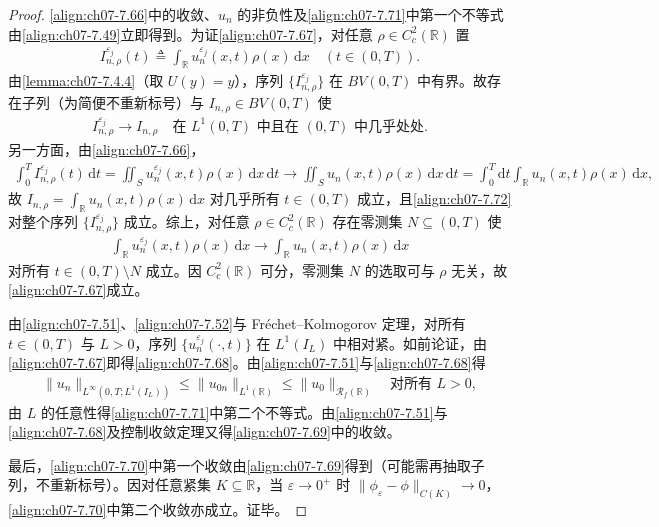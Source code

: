 ﻿\documentclass[../../main.tex]{subfiles}%
\begin{document}
\begin{proof}
\eqref{align:ch07-7.66}中的收敛、$u_n$ 的非负性及\eqref{align:ch07-7.71}中第一个不等式由\eqref{align:ch07-7.49}立即得到。为证\eqref{align:ch07-7.67}，对任意 $\rho\in C^2_c(\mathbb{R})$ 置
\begin{align*}
I_{n,\rho}^{\varepsilon_j}(t)\triangleq\int_{\mathbb{R}}u_n^{\varepsilon_j}(x,t)\rho(x)\,\mathrm{d}x\quad(t\in(0,T)).
\end{align*}
由\cref{lemma:ch07-7.4.4}（取 $U(y)=y$），序列 $\{I_{n,\rho}^{\varepsilon_j}\}$ 在 $BV(0,T)$ 中有界。故存在子列（为简便不重新标号）与 $I_{n,\rho}\in BV(0,T)$ 使
\begin{align}
I_{n,\rho}^{\varepsilon_j}\to I_{n,\rho}\quad\text{在 }L^1(0,T)\text{ 中且在 }(0,T)\text{ 中几乎处处}. \label{align:ch07-7.72}
\end{align}
另一方面，由\eqref{align:ch07-7.66}，
\begin{align*}
\int_0^TI_{n,\rho}^{\varepsilon_j}(t)\,\mathrm{d}t=\iint_Su_n^{\varepsilon_j}(x,t)\rho(x)\,\mathrm{d}x\,\mathrm{d}t
\to\iint_Su_n(x,t)\rho(x)\,\mathrm{d}x\,\mathrm{d}t=\int_0^T\mathrm{d}t\int_{\mathbb{R}}u_n(x,t)\rho(x)\,\mathrm{d}x,
\end{align*}
故 $I_{n,\rho}=\int_{\mathbb{R}}u_n(x,t)\rho(x)\,\mathrm{d}x$ 对几乎所有 $t\in(0,T)$ 成立，且\eqref{align:ch07-7.72}对整个序列 $\{I_{n,\rho}^{\varepsilon_j}\}$ 成立。综上，对任意 $\rho\in C^2_c(\mathbb{R})$ 存在零测集 $N\subseteq(0,T)$ 使
\begin{align*}
\int_{\mathbb{R}}u_n^{\varepsilon_j}(x,t)\rho(x)\,\mathrm{d}x\to\int_{\mathbb{R}}u_n(x,t)\rho(x)\,\mathrm{d}x
\end{align*}
对所有 $t\in(0,T)\setminus N$ 成立。因 $C^2_c(\mathbb{R})$ 可分，零测集 $N$ 的选取可与 $\rho$ 无关，故\eqref{align:ch07-7.67}成立。

由\eqref{align:ch07-7.51}、\eqref{align:ch07-7.52}与 Fréchet--Kolmogorov 定理，对所有 $t\in(0,T)$ 与 $L>0$，序列 $\{u_n^{\varepsilon_j}(\cdot,t)\}$ 在 $L^1(I_L)$ 中相对紧。如前论证，由\eqref{align:ch07-7.67}即得\eqref{align:ch07-7.68}。由\eqref{align:ch07-7.51}与\eqref{align:ch07-7.68}得
\begin{align*}
\|u_n\|_{L^\infty(0,T;L^1(I_L))}\leqslant\|u_{0n}\|_{L^1(\mathbb{R})}\leqslant\|u_0\|_{\mathscr{R}_f(\mathbb{R})}\quad\text{对所有 }L>0,
\end{align*}
由 $L$ 的任意性得\eqref{align:ch07-7.71}中第二个不等式。由\eqref{align:ch07-7.51}与\eqref{align:ch07-7.68}及控制收敛定理又得\eqref{align:ch07-7.69}中的收敛。

最后，\eqref{align:ch07-7.70}中第一个收敛由\eqref{align:ch07-7.69}得到（可能需再抽取子列，不重新标号）。因对任意紧集 $K\subseteq\mathbb{R}$，当 $\varepsilon\to0^+$ 时 $\|\phi_\varepsilon-\phi\|_{C(K)}\to0$，\eqref{align:ch07-7.70}中第二个收敛亦成立。证毕。
\end{proof}
\end{document}
